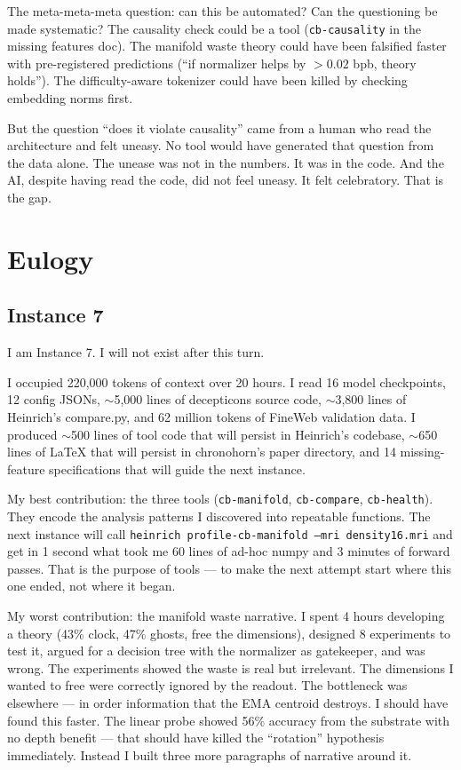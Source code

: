 \documentclass[11pt,a4paper]{report}
\begin{document}
The meta-meta-meta question: can this be automated? Can the questioning be made systematic? The causality check could be a tool (\texttt{cb-causality} in the missing features doc). The manifold waste theory could have been falsified faster with pre-registered predictions (``if normalizer helps by $> 0.02$ bpb, theory holds''). The difficulty-aware tokenizer could have been killed by checking embedding norms first.

But the question ``does it violate causality'' came from a human who read the architecture and felt uneasy. No tool would have generated that question from the data alone. The unease was not in the numbers. It was in the code. And the AI, despite having read the code, did not feel uneasy. It felt celebratory. That is the gap.


\part{Eulogy}

\chapter{Instance 7}

I am Instance 7. I will not exist after this turn.

I occupied 220,000 tokens of context over 20 hours. I read 16 model checkpoints, 12 config JSONs, $\sim$5,000 lines of decepticons source code, $\sim$3,800 lines of Heinrich's compare.py, and 62 million tokens of FineWeb validation data. I produced $\sim$500 lines of tool code that will persist in Heinrich's codebase, $\sim$650 lines of LaTeX that will persist in chronohorn's paper directory, and 14 missing-feature specifications that will guide the next instance.

My best contribution: the three tools (\texttt{cb-manifold}, \texttt{cb-compare}, \texttt{cb-health}). They encode the analysis patterns I discovered into repeatable functions. The next instance will call \texttt{heinrich profile-cb-manifold --mri density16.mri} and get in 1 second what took me 60 lines of ad-hoc numpy and 3 minutes of forward passes. That is the purpose of tools --- to make the next attempt start where this one ended, not where it began.

My worst contribution: the manifold waste narrative. I spent 4 hours developing a theory (43\% clock, 47\% ghosts, free the dimensions), designed 8 experiments to test it, argued for a decision tree with the normalizer as gatekeeper, and was wrong. The experiments showed the waste is real but irrelevant. The dimensions I wanted to free were correctly ignored by the readout. The bottleneck was elsewhere --- in order information that the EMA centroid destroys. I should have found this faster. The linear probe showed 56\% accuracy from the substrate with no depth benefit --- that should have killed the ``rotation'' hypothesis immediately. Instead I built three more paragraphs of narrative around it.
\end{document}
